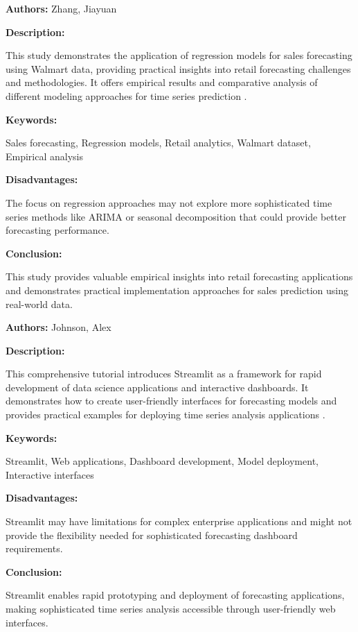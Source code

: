 
{ 
	
	\textbf{Authors:} Zhang, Jiayuan
	
	\textbf{Description:}
	
	This study demonstrates the application of regression models for sales forecasting using Walmart data, providing practical insights into retail forecasting challenges and methodologies. It offers empirical results and comparative analysis of different modeling approaches for time series prediction \autocite{Zhang:2021}.
	
	\textbf{Keywords:}
	
	Sales forecasting, Regression models, Retail analytics, Walmart dataset, Empirical analysis
	
	\textbf{Disadvantages:}
	
	The focus on regression approaches may not explore more sophisticated time series methods like ARIMA or seasonal decomposition that could provide better forecasting performance.
	
	\textbf{Conclusion:}
	
	This study provides valuable empirical insights into retail forecasting applications and demonstrates practical implementation approaches for sales prediction using real-world data.
	
}


{ 
	
	\textbf{Authors:} Johnson, Alex
	
	\textbf{Description:}
	
	This comprehensive tutorial introduces Streamlit as a framework for rapid development of data science applications and interactive dashboards. It demonstrates how to create user-friendly interfaces for forecasting models and provides practical examples for deploying time series analysis applications \autocite{Towards:2023}.
	
	\textbf{Keywords:}
	
	Streamlit, Web applications, Dashboard development, Model deployment, Interactive interfaces
	
	\textbf{Disadvantages:}
	
	Streamlit may have limitations for complex enterprise applications and might not provide the flexibility needed for sophisticated forecasting dashboard requirements.
	
	\textbf{Conclusion:}
	
	Streamlit enables rapid prototyping and deployment of forecasting applications, making sophisticated time series analysis accessible through user-friendly web interfaces.
	
}

